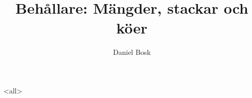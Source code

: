 \documentclass[ignoreframetext]{beamer}
\begin{document}
\title{%
  Behållare: Mängder, stackar och köer
}
\author{Daniel Bosk}

\begin{frame}
  \maketitle
\end{frame}

\mode<all>

\mode*
%

\end{document}
